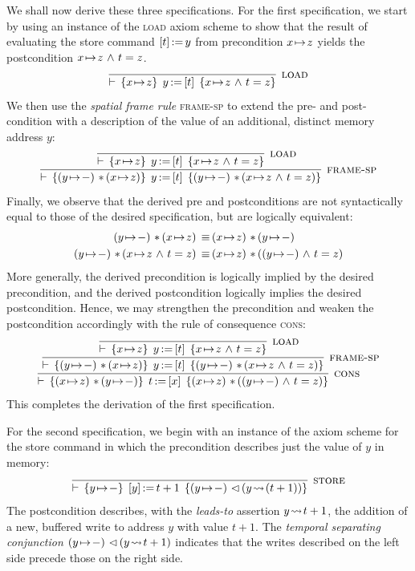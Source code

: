 \documentclass[11pt]{report}
\begin{document}
We shall now derive these three specifications. For the first specification, we start by using an instance of the \textsc{load} axiom scheme to show that the result of evaluating the store command $\left[ t \right] \operatorname{:\!=} y$ from precondition $x \!\mapsto\! z$ yields the postcondition $x \!\mapsto\! z \operatorname{\,\wedge\,} t = z$.
\[ 
  \infer[\textsc{load}]{\triple{x \fpointsto z}{\cload{y}{t}}{x \fpointsto z \conj t = z}}{}
\] We then use the \emph{spatial frame rule} \textsc{frame-sp} to extend the pre- and post-condition with a description of the value of an additional, distinct memory address $y$: \[ 
  \infer[\textsc{frame-sp}]{\triple{(y \fpointsto -) \fsep (x \fpointsto z)}{\cload{y}{t}}{(y \fpointsto -) \fsep (x \fpointsto z \conj t = z)}}{
    \infer[\textsc{load}]{\triple{x \fpointsto z}{\cload{y}{t}}{x \fpointsto z \conj t = z}}{}
  }
\] Finally, we observe that the derived pre and postconditions are not syntactically equal to those of the desired specification, but are logically equivalent: \begin{align*}
(y \fpointsto -) \fsep (x \fpointsto z) \sequiv & (x \fpointsto z) \fsep (y \fpointsto -) \\ 
(y \fpointsto -) \fsep (x \fpointsto z \conj t = z) \sequiv & (x \fpointsto z) \fsep ((y \fpointsto -) \conj t = z)
\end{align*} More generally, the derived precondition is logically implied by the desired precondition, and the derived postcondition logically implies the desired postcondition. Hence, we may strengthen the precondition and weaken the postcondition accordingly with the rule of consequence \textsc{cons}: \[ 
  \infer[\textsc{cons}]{\triple{(x \fpointsto z) \fsep (y \fpointsto -)}{\cload{t}{x}}{(x \fpointsto z) \fsep ((y \fpointsto -) \conj t = z)}}{
    \infer[\textsc{frame-sp}]{\triple{(y \fpointsto -) \fsep (x \fpointsto z)}{\cload{y}{t}}{(y \fpointsto -) \fsep (x \fpointsto z \conj t = z)}}{
      \infer[\textsc{load}]{\triple{x \fpointsto z}{\cload{y}{t}}{x \fpointsto z \conj t = z}}{}
    }
  }
\] This completes the derivation of the first specification. 

For the second specification, we begin with an instance of the axiom scheme for the store command in which the precondition describes just the value of $y$ in memory: \[ \infer[\textsc{store}]{\triple{y \fpointsto -}{\cstore{y}{t+1}}{(y \fpointsto -) \fseq (y \fwriteu (t+1))}}{}\] The postcondition describes, with the \emph{leads-to} assertion $y \!\leadsto\!  t+1$, the addition of a new, buffered write to address $y$ with value $t+1$. The \emph{temporal separating conjunction} $(y \!\mapsto\! -) \operatorname{\,\vartriangleleft\,} (y \!\leadsto\! t+1)$ indicates that the writes described on the left side precede those on the right side. 
\end{document}
